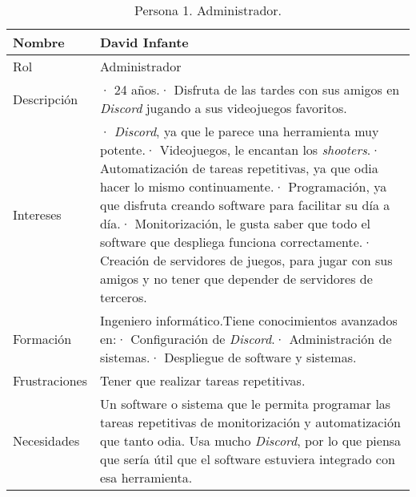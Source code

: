 \begin{table}[H]
    \centering
    \def\arraystretch{1.25}
    \begin{adjustbox}{max width=\textwidth}
    \begin{tabularx}{\textwidth}{|l|L|}
    \hline
        \textbf{Nombre} & \textbf{David Infante} \\ \hline
    \hline
        Rol & Administrador \\ \hline
        Descripción & · 24 años.\linebreak · Disfruta de las tardes con sus amigos en \textit{Discord} jugando a sus videojuegos favoritos. \\ \hline
        Intereses & · \textit{Discord}, ya que le parece una herramienta muy potente.\linebreak · Videojuegos, le encantan los \textit{shooters}.\linebreak · Automatización de tareas repetitivas, ya que odia hacer lo mismo continuamente.\linebreak · Programación, ya que disfruta creando software para facilitar su día a día.\linebreak · Monitorización, le gusta saber que todo el software que despliega funciona correctamente.\linebreak · Creación de servidores de juegos, para jugar con sus amigos y no tener que depender de servidores de terceros. \\ \hline
        Formación & Ingeniero informático.\linebreak\linebreak Tiene conocimientos avanzados en:\linebreak · Configuración de \textit{Discord}.\linebreak · Administración de sistemas.\linebreak · Despliegue de software y sistemas. \\ \hline
        Frustraciones & Tener que realizar tareas repetitivas. \\ \hline
        Necesidades & Un software o sistema que le permita programar las tareas repetitivas de monitorización y automatización que tanto odia. Usa mucho \textit{Discord}, por lo que piensa que sería útil que el software estuviera integrado con esa herramienta. \\ \hline
    \end{tabularx}
    \end{adjustbox}
    \caption{Persona 1. Administrador.}
\end{table}


